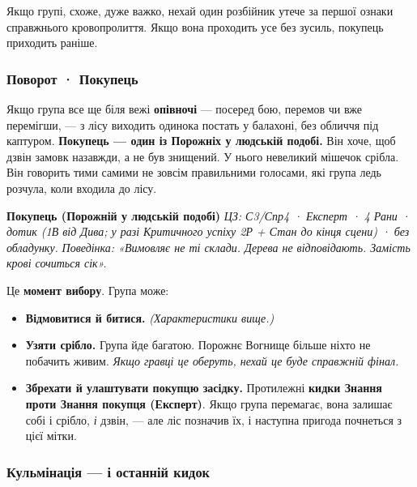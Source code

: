 \documentclass[10pt,a4paper]{article}
\newcommand{\tightlist}{\setlength{\itemsep}{0pt}\setlength{\parskip}{0pt}}
\begin{document}
Якщо групі, схоже, дуже важко, нехай один розбійник утече за першої ознаки справжнього кровопролиття. Якщо вона проходить усе без зусиль, покупець приходить раніше.

\subsubsection{Поворот · Покупець}\label{ux43fux43eux432ux43eux440ux43eux442-ux43fux43eux43aux443ux43fux435ux446ux44c}

Якщо група все ще біля вежі \textbf{опівночі} --- посеред бою, перемов чи вже перемігши, --- з лісу виходить одинока постать у балахоні, без обличчя під каптуром. \textbf{Покупець --- один із Порожніх у людській подобі.} Він хоче, щоб дзвін замовк назавжди, а не був знищений. У нього невеликий мішечок срібла. Він говорить тими самими не зовсім правильними голосами, які група ледь розчула, коли входила до лісу.

\par\smallskip\begin{rpgnote}[fontupper=\normalfont]\textbf{Покупець (Порожній у людській подобі)} \emph{ЦЗ: С3/Спр4 · Експерт · 4 Рани · дотик (1В від Дива; у разі Критичного успіху 2Р + Стан до кінця сцени) · без обладунку.} \emph{Поведінка: «Вимовляє не ті склади. Дерева не відповідають. Замість крові сочиться сік».}\end{rpgnote}\par\smallskip
Це \textbf{момент вибору}. Група може:

\begin{itemize}
\tightlist
\item
  \textbf{Відмовитися й битися.} \emph{(Характеристики вище.)}
\item
  \textbf{Узяти срібло.} Група йде багатою. Порожнє Вогнище більше ніхто не побачить живим. \emph{Якщо гравці це оберуть, нехай це буде справжній фінал.}
\item
  \textbf{Збрехати й улаштувати покупцю засідку.} Протилежні \textbf{кидки Знання проти Знання покупця (Експерт)}. Якщо група перемагає, вона залишає собі і срібло, \emph{і} дзвін, --- але ліс позначив їх, і наступна пригода почнеться з цієї мітки.
\end{itemize}

\subsubsection{Кульмінація --- і останній кидок}\label{ux43aux443ux43bux44cux43cux456ux43dux430ux446ux456ux44f-ux43eux441ux442ux430ux43dux43dux456ux439-ux43aux438ux434ux43eux43a}
\end{document}
